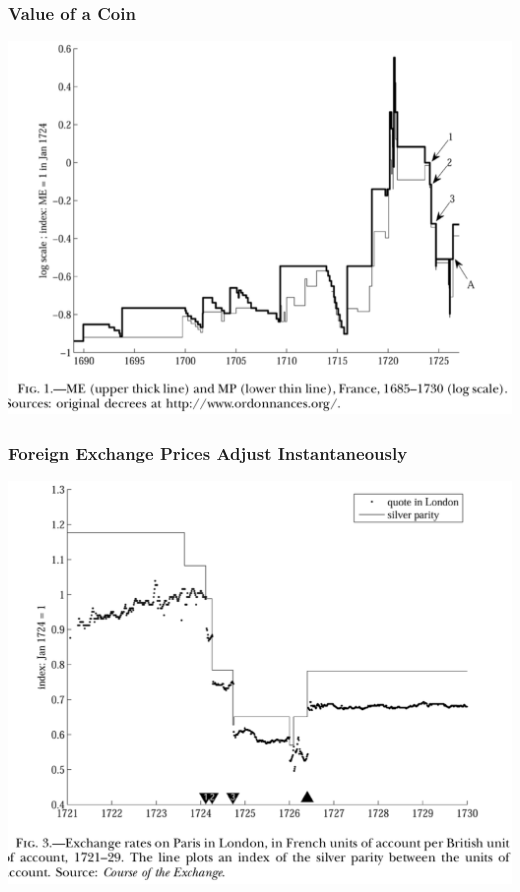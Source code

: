 \documentclass[english,xcolor=svgnames]{beamer}
\begin{document}
\begin{frame}
\frametitle{Value of a Coin}
\centering
\includegraphics[scale=0.5]{../../Images/Velde2009coin.png}	
\end{frame}

\begin{frame}
\frametitle{Foreign Exchange Prices Adjust Instantaneously}
\centering
\includegraphics[scale=0.5]{../../Images/Velde2009fx.png}	
\end{frame}
\end{document}
